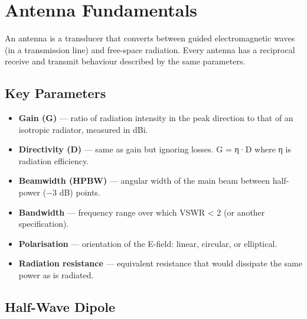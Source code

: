 \section{Antenna Fundamentals}\label{sec:wiki_antennas}



An antenna is a transducer that converts between guided electromagnetic waves (in a transmission line) and free-space radiation. Every antenna has a reciprocal receive and transmit behaviour described by the same parameters.

				

\subsection{Key Parameters}

				
\begin{itemize}

					\item \textbf{Gain (G)} — ratio of radiation intensity in the peak direction to that of an isotropic radiator, measured in dBi.

					\item \textbf{Directivity (D)} — same as gain but ignoring losses. G = η·D where η is radiation efficiency.

					\item \textbf{Beamwidth (HPBW)} — angular width of the main beam between half-power (−3 dB) points.

					\item \textbf{Bandwidth} — frequency range over which VSWR \textless{} 2 (or another specification).

					\item \textbf{Polarisation} — orientation of the E-field: linear, circular, or elliptical.

					\item \textbf{Radiation resistance} — equivalent resistance that would dissipate the same power as is radiated.

				
\end{itemize}

				

\subsection{Half-Wave Dipole}

				


